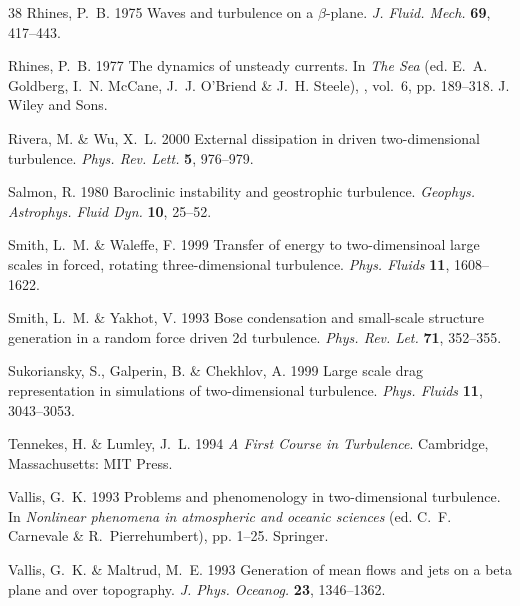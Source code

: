 \documentclass{jfm}
\begin{document}
\begin{thebibliography}{38}
{\sc Rhines, P.~B.} 1975 Waves and turbulence on a $\beta$-plane. {\em J.
  Fluid. Mech.\/} {\bf 69}, 417--443.

{\sc Rhines, P.~B.} 1977 The dynamics of unsteady currents. In {\em The Sea\/}
  (ed. E.~A. Goldberg, I.~N. McCane, J.~J. O'Briend \& J.~H. Steele), , vol.~6,
  pp. 189--318. J. Wiley and Sons.

{\sc Rivera, M. \& Wu, X.~L.} 2000 External dissipation in driven
  two-dimensional turbulence. {\em Phys. Rev. Lett.\/} {\bf 5}, 976--979.

{\sc Salmon, R.} 1980 Baroclinic instability and geostrophic turbulence. {\em
  Geophys. Astrophys. Fluid Dyn.\/} {\bf 10}, 25--52.

{\sc Smith, L.~M. \& Waleffe, F.} 1999 Transfer of energy to two-dimensinoal
  large scales in forced, rotating three-dimensional turbulence. {\em Phys.
  Fluids\/} {\bf 11}, 1608--1622.

{\sc Smith, L.~M. \& Yakhot, V.} 1993 Bose condensation and small-scale
  structure generation in a random force driven 2d turbulence. {\em Phys. Rev.
  Let.\/} {\bf 71}, 352--355.

{\sc Sukoriansky, S., Galperin, B. \& Chekhlov, A.} 1999 Large scale drag
  representation in simulations of two-dimensional turbulence. {\em Phys.
  Fluids\/} {\bf 11}, 3043--3053.

{\sc Tennekes, H. \& Lumley, J.~L.} 1994 {\em A First Course in Turbulence\/}.
  Cambridge, Massachusetts: MIT Press.

{\sc Vallis, G.~K.} 1993 Problems and phenomenology in two-dimensional
  turbulence. In {\em Nonlinear phenomena in atmospheric and oceanic
  sciences\/} (ed. C.~F. Carnevale \& R.~Pierrehumbert), pp. 1--25. Springer.

{\sc Vallis, G.~K. \& Maltrud, M.~E.} 1993 Generation of mean flows and jets on
  a beta plane and over topography. {\em J. Phys. Oceanog.\/} {\bf 23},
  1346--1362.

\end{thebibliography}


\end{document}
